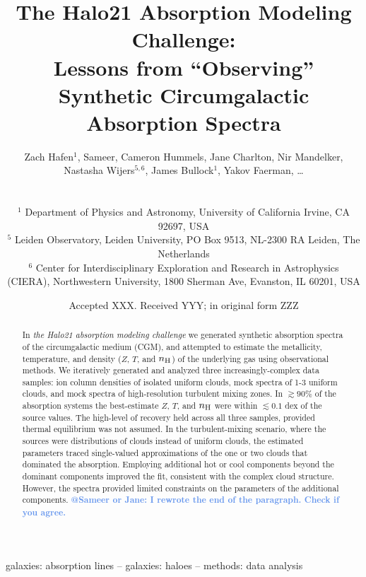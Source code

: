 \documentclass[fleqn,usenatbib]{mnras}
\title[``Observing'' Synthetic Circumgalactic Absorption Spectra]{The Halo21 Absorption Modeling Challenge:\\Lessons from ``Observing'' Synthetic Circumgalactic Absorption Spectra}
\author[Hafen, Sameer, et al.]{
\parbox{\textwidth}{
Zach Hafen$^{1}$,
Sameer,
Cameron Hummels,
Jane Charlton,
Nir Mandelker,
Nastasha Wijers$^{5, 6}$,
James Bullock$^{1}$,
Yakov Faerman,
\ldots
} \vspace{0.4cm}\\
\parbox{\textwidth}{
$^1$ Department of Physics and Astronomy, University of California Irvine, CA 92697, USA \\
$^5$ Leiden Observatory, Leiden University, PO Box 9513, NL-2300 RA Leiden, The Netherlands \\
$^6$ Center for Interdisciplinary Exploration and Research in Astrophysics (CIERA), Northwestern University, 1800 Sherman Ave, Evanston, IL 60201, USA \\
}
}
\date{Accepted XXX. Received YYY; in original form ZZZ}
\makeatletter
\newcommand{\atsameer}[1]{\textcolor{CornflowerBlue}{\textbf{@Sameer or Jane: #1}}}
\makeatother
\begin{document}
\label{firstpage}
\pagerange{\pageref{firstpage}--\pageref{lastpage}}
\maketitle

\begin{abstract}
In \textit{the Halo21 absorption modeling challenge} we generated synthetic absorption spectra of the circumgalactic medium (CGM),
and attempted to estimate the metallicity, temperature, and density ($Z$, $T$, and $n_{\rm H}$) of the underlying gas using observational methods.
We iteratively generated and analyzed three increasingly-complex data samples:
ion column densities of isolated uniform clouds,
mock spectra of 1-3 uniform clouds,
and mock spectra of high-resolution turbulent mixing zones.
In $\gtrsim 90\%$ of the absorption systems the best-estimate $Z$, $T$, and $n_{\rm H}$ were within $\lesssim0.1$ dex of the source values.
The high-level of recovery held across all three samples, provided thermal equilibrium was not assumed.
In the turbulent-mixing scenario, where the sources were distributions of clouds instead of uniform clouds, the estimated parameters traced single-valued approximations of the one or two clouds that dominated the absorption.
Employing additional hot or cool components beyond the dominant components improved the fit,
consistent with the complex cloud structure.
However, the spectra provided limited constraints on the parameters of the additional components.
\atsameer{I rewrote the end of the paragraph. Check if you agree.}
\end{abstract}

\begin{keywords}
galaxies: absorption lines -- galaxies: haloes -- methods: data analysis
\end{keywords}
\end{document}
